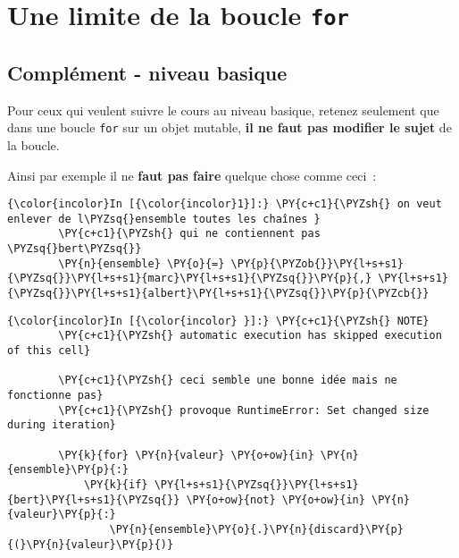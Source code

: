     
    
    
    

    

    \hypertarget{une-limite-de-la-boucle-for}{%
\section{\texorpdfstring{Une limite de la boucle
\texttt{for}}{Une limite de la boucle for}}\label{une-limite-de-la-boucle-for}}

    \hypertarget{compluxe9ment---niveau-basique}{%
\subsection{Complément - niveau
basique}\label{compluxe9ment---niveau-basique}}

    Pour ceux qui veulent suivre le cours au niveau basique, retenez
seulement que dans une boucle \texttt{for} sur un objet mutable,
\textbf{il ne faut pas modifier le sujet} de la boucle.

Ainsi par exemple il ne \textbf{faut pas faire} quelque chose comme
ceci~:

    \begin{Verbatim}[commandchars=\\\{\}]
{\color{incolor}In [{\color{incolor}1}]:} \PY{c+c1}{\PYZsh{} on veut enlever de l\PYZsq{}ensemble toutes les chaînes }
        \PY{c+c1}{\PYZsh{} qui ne contiennent pas \PYZsq{}bert\PYZsq{}}
        \PY{n}{ensemble} \PY{o}{=} \PY{p}{\PYZob{}}\PY{l+s+s1}{\PYZsq{}}\PY{l+s+s1}{marc}\PY{l+s+s1}{\PYZsq{}}\PY{p}{,} \PY{l+s+s1}{\PYZsq{}}\PY{l+s+s1}{albert}\PY{l+s+s1}{\PYZsq{}}\PY{p}{\PYZcb{}}
\end{Verbatim}


    \begin{Verbatim}[commandchars=\\\{\}]
{\color{incolor}In [{\color{incolor} }]:} \PY{c+c1}{\PYZsh{} NOTE}
        \PY{c+c1}{\PYZsh{} automatic execution has skipped execution of this cell}
        
        \PY{c+c1}{\PYZsh{} ceci semble une bonne idée mais ne fonctionne pas}
        \PY{c+c1}{\PYZsh{} provoque RuntimeError: Set changed size during iteration}
        
        \PY{k}{for} \PY{n}{valeur} \PY{o+ow}{in} \PY{n}{ensemble}\PY{p}{:}
            \PY{k}{if} \PY{l+s+s1}{\PYZsq{}}\PY{l+s+s1}{bert}\PY{l+s+s1}{\PYZsq{}} \PY{o+ow}{not} \PY{o+ow}{in} \PY{n}{valeur}\PY{p}{:}
                \PY{n}{ensemble}\PY{o}{.}\PY{n}{discard}\PY{p}{(}\PY{n}{valeur}\PY{p}{)}
\end{Verbatim}


